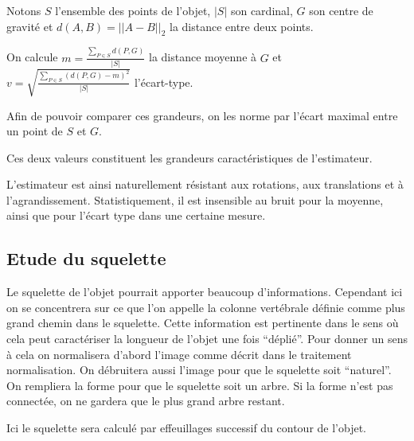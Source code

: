 \documentclass{article}
\theoremstyle{definition}
\begin{document}
      Notons $S$ l'ensemble des points de l'objet, $|S|$ son cardinal, $G$ son centre de gravité et $d(A,B)=||A-B||_2$ la distance entre deux points.
      
      On calcule $m=\frac{\sum_{P\in S}d(P,G)}{|S|}$ la distance moyenne à $G$ et $v=\sqrt{\frac{\sum_{P\in S}\left ( d(P,G) -m\right ) ^2}{|S|}}$ l'écart-type.
      
      Afin de pouvoir comparer ces grandeurs, on les norme par l'écart maximal entre un point de $S$ et $G$.
      
      Ces deux valeurs constituent les grandeurs caractéristiques de l'estimateur.
      
      L'estimateur est ainsi naturellement résistant aux rotations, aux translations et à l'agrandissement. Statistiquement, il est insensible au bruit pour la moyenne, ainsi que pour l'écart type dans une certaine mesure.
    
    \subsection{Etude du squelette} 
    
    Le squelette de l'objet pourrait apporter beaucoup d'informations. Cependant ici on se concentrera sur ce que l'on appelle la colonne vertébrale définie comme plus grand chemin dans le squelette. Cette information est pertinente dans le sens où cela peut caractériser la longueur de l'objet une fois ``déplié''. Pour donner un sens à cela on normalisera d'abord l'image comme décrit dans le traitement normalisation. On débruitera aussi l'image pour que le squelette soit ``naturel''. On rempliera la forme pour que le squelette soit un arbre. Si la forme n'est pas connectée, on ne gardera que le plus grand arbre restant.
    
    Ici le squelette sera calculé par effeuillages successif du contour de l'objet.
    
\end{document}
